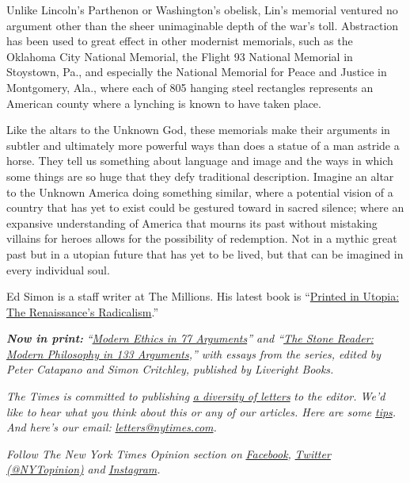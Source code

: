 Unlike Lincoln's Parthenon or Washington's obelisk, Lin's memorial
ventured no argument other than the sheer unimaginable depth of the
war's toll. Abstraction has been used to great effect in other modernist
memorials, such as the Oklahoma City National Memorial, the Flight 93
National Memorial in Stoystown, Pa., and especially the National
Memorial for Peace and Justice in Montgomery, Ala., where each of 805
hanging steel rectangles represents an American county where a lynching
is known to have taken place.

Like the altars to the Unknown God, these memorials make their arguments
in subtler and ultimately more powerful ways than does a statue of a man
astride a horse. They tell us something about language and image and the
ways in which some things are so huge that they defy traditional
description. Imagine an altar to the Unknown America doing something
similar, where a potential vision of a country that has yet to exist
could be gestured toward in sacred silence; where an expansive
understanding of America that mourns its past without mistaking villains
for heroes allows for the possibility of redemption. Not in a mythic
great past but in a utopian future that has yet to be lived, but that
can be imagined in every individual soul.

Ed Simon is a staff writer at The Millions. His latest book is
``\href{https://www.johnhuntpublishing.com/zer0-books/our-books/printed-in-utopia}{Printed
in Utopia: The Renaissance's Radicalism}.''

\emph{\textbf{Now in print:}}
\emph{``}\href{http://bitly.com/1MW2kN3}{\emph{Modern Ethics in 77
Arguments}}\emph{'' and ``}\href{http://bitly.com/1MW2kN3}{\emph{The
Stone Reader: Modern Philosophy in 133 Arguments}}\emph{,'' with essays
from the series, edited by Peter Catapano and Simon Critchley, published
by Liveright Books.}

\emph{The Times is committed to publishing}
\href{https://www.nytimes.com/2019/01/31/opinion/letters/letters-to-editor-new-york-times-women.html}{\emph{a
diversity of letters}} \emph{to the editor. We'd like to hear what you
think about this or any of our articles. Here are some}
\href{https://help.nytimes.com/hc/en-us/articles/115014925288-How-to-submit-a-letter-to-the-editor}{\emph{tips}}\emph{.
And here's our email:}
\href{mailto:letters@nytimes.com}{\emph{letters@nytimes.com}}\emph{.}

\emph{Follow The New York Times Opinion section on}
\href{https://www.facebook.com/nytopinion}{\emph{Facebook}}\emph{,}
\href{http://twitter.com/NYTOpinion}{\emph{Twitter (@NYTopinion)}}
\emph{and}
\href{https://www.instagram.com/nytopinion/}{\emph{Instagram}}\emph{.}

